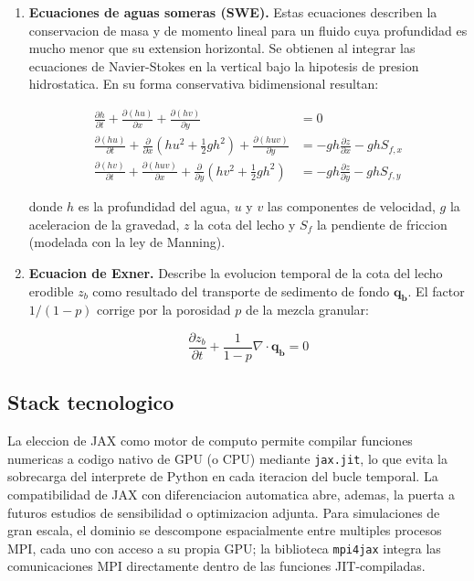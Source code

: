 \documentclass[11pt,a4paper]{article}
\newcommand{\code}[1]{\texttt{#1}}
\begin{document}
\begin{enumerate}[leftmargin=1.8em]
  \item \textbf{Ecuaciones de aguas someras (SWE).}
  Estas ecuaciones describen la conservacion de masa y de momento lineal para un fluido cuya
  profundidad es mucho menor que su extension horizontal. Se obtienen al integrar las ecuaciones
  de Navier-Stokes en la vertical bajo la hipotesis de presion hidrostatica. En su forma
  conservativa bidimensional resultan:

  \begin{align*}
    \frac{\partial h}{\partial t}
    + \frac{\partial (hu)}{\partial x}
    + \frac{\partial (hv)}{\partial y} &= 0 \\
    \frac{\partial (hu)}{\partial t}
    + \frac{\partial}{\partial x}\left(hu^2 + \frac{1}{2}gh^2\right)
    + \frac{\partial (huv)}{\partial y} &= -gh\frac{\partial z}{\partial x} - ghS_{f,x} \\
    \frac{\partial (hv)}{\partial t}
    + \frac{\partial (huv)}{\partial x}
    + \frac{\partial}{\partial y}\left(hv^2 + \frac{1}{2}gh^2\right) &= -gh\frac{\partial z}{\partial y} - ghS_{f,y}
  \end{align*}

  donde $h$ es la profundidad del agua, $u$ y $v$ las componentes de velocidad,
  $g$ la aceleracion de la gravedad, $z$ la cota del lecho y $S_{f}$ la pendiente de friccion
  (modelada con la ley de Manning).

  \item \textbf{Ecuacion de Exner.}
  Describe la evolucion temporal de la cota del lecho erodible $z_b$ como resultado del
  transporte de sedimento de fondo $\mathbf{q_b}$. El factor $1/(1-p)$ corrige por la
  porosidad $p$ de la mezcla granular:

  \[
    \frac{\partial z_b}{\partial t} + \frac{1}{1-p}\nabla \cdot \mathbf{q_b} = 0
  \]
\end{enumerate}

\subsection{Stack tecnologico}

La eleccion de JAX como motor de computo permite compilar funciones numericas a codigo
nativo de GPU (o CPU) mediante \code{jax.jit}, lo que evita la sobrecarga del interprete
de Python en cada iteracion del bucle temporal. La compatibilidad de JAX con
diferenciacion automatica abre, ademas, la puerta a futuros estudios de sensibilidad o
optimizacion adjunta. Para simulaciones de gran escala, el dominio se descompone
espacialmente entre multiples procesos MPI, cada uno con acceso a su propia GPU; la biblioteca
\code{mpi4jax} integra las comunicaciones MPI directamente dentro de las funciones
JIT-compiladas.
\end{document}
